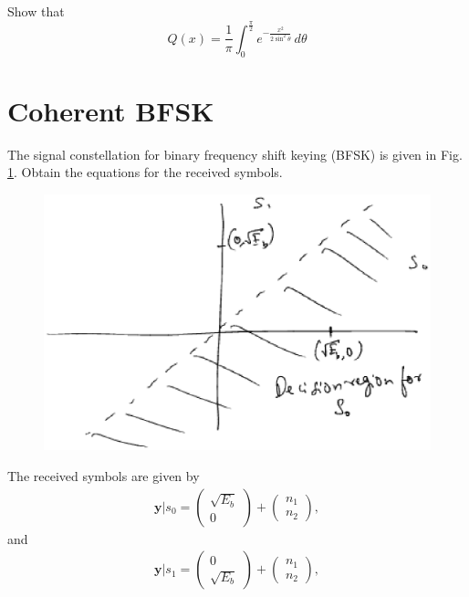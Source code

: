 \documentclass[journal,12pt,twocolumn]{IEEEtran}
\begin{document}
\begin{problem}
Show that
\begin{equation}
Q(x) = \frac{1}{\pi}\int^{\frac{\pi}{2}}_{0}e^{-\frac{x^2}{2\sin^2 \theta}}\,d\theta
\end{equation}
\end{problem}
\section{Coherent BFSK}
\begin{problem}
The signal constellation for binary frequency shift keying (BFSK) is given in Fig. \ref{fig:bfsk_const}.
Obtain the equations for the received symbols.
\end{problem}
\begin{figure}[!h]
\centering
\includegraphics[width=\columnwidth]{./figs/bfsk_const.eps}
\caption{}
\label{fig:bfsk_const}
\end{figure}
\solution
The received symbols are given by
\begin{align}
\mathbf{y}|s_0 = 
\begin{pmatrix*}
\sqrt{E_b} \\
0
\end{pmatrix*}
+
\begin{pmatrix*}
 n_{1}\\
n_{2}
\end{pmatrix*},
\end{align}
and 
\begin{align}
\mathbf{y}|s_1 = 
\begin{pmatrix*}
0\\
\sqrt{E_b} 
\end{pmatrix*}
+
\begin{pmatrix*}
n_{1}\\
 n_{2}
\end{pmatrix*},
\end{align}
\end{document}
